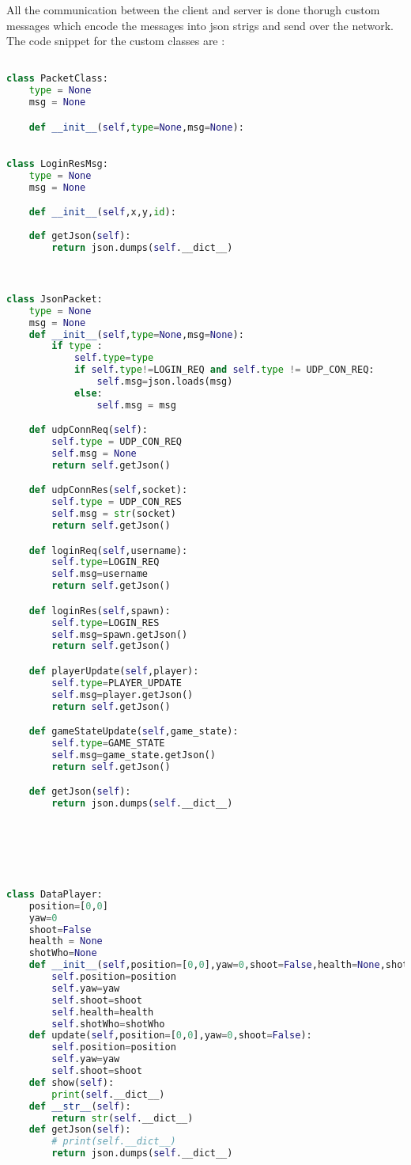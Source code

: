     All the communication between the client and server is done thorugh custom messages which encode the messages into json strigs and send over the network. The code snippet for the custom classes are  :
    \begin{lstlisting}[language=Python]

class PacketClass:
    type = None
    msg = None

    def __init__(self,type=None,msg=None):
    

class LoginResMsg:
    type = None
    msg = None

    def __init__(self,x,y,id):
        
    def getJson(self):
        return json.dumps(self.__dict__)



class JsonPacket:
    type = None
    msg = None
    def __init__(self,type=None,msg=None):
        if type :
            self.type=type
            if self.type!=LOGIN_REQ and self.type != UDP_CON_REQ:
                self.msg=json.loads(msg)
            else:
                self.msg = msg

    def udpConnReq(self):
        self.type = UDP_CON_REQ
        self.msg = None
        return self.getJson()

    def udpConnRes(self,socket):
        self.type = UDP_CON_RES
        self.msg = str(socket)
        return self.getJson()

    def loginReq(self,username):
        self.type=LOGIN_REQ
        self.msg=username
        return self.getJson()

    def loginRes(self,spawn):
        self.type=LOGIN_RES
        self.msg=spawn.getJson()
        return self.getJson()

    def playerUpdate(self,player):
        self.type=PLAYER_UPDATE
        self.msg=player.getJson()
        return self.getJson()

    def gameStateUpdate(self,game_state):
        self.type=GAME_STATE
        self.msg=game_state.getJson()
        return self.getJson()

    def getJson(self):
        return json.dumps(self.__dict__)






class DataPlayer:
    position=[0,0]
    yaw=0
    shoot=False
    health = None
    shotWho=None
    def __init__(self,position=[0,0],yaw=0,shoot=False,health=None,shotWho=None):
        self.position=position
        self.yaw=yaw
        self.shoot=shoot
        self.health=health
        self.shotWho=shotWho
    def update(self,position=[0,0],yaw=0,shoot=False):
        self.position=position
        self.yaw=yaw
        self.shoot=shoot
    def show(self):
        print(self.__dict__)
    def __str__(self):
        return str(self.__dict__)
    def getJson(self):
        # print(self.__dict__)
        return json.dumps(self.__dict__)

    \end{lstlisting}

